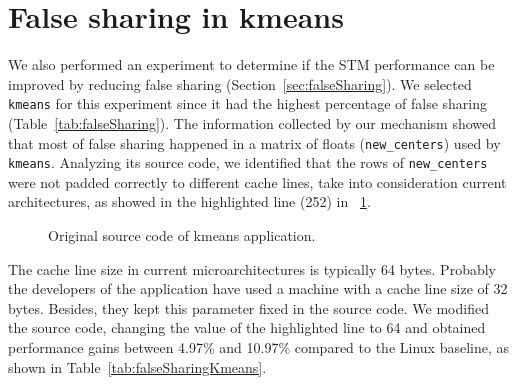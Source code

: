 \section{False sharing in kmeans}


We also performed an experiment to determine if the STM performance can be improved by reducing false sharing (Section~\ref{sec:falseSharing}). %
We selected \texttt{kmeans} for this experiment since it had the highest percentage of false sharing (Table~\ref{tab:falseSharing}). The information collected by our mechanism showed that most of false sharing happened in a matrix of floats (\texttt{new\_centers}) used by \texttt{kmeans}. Analyzing its source code, we identified that the rows of \texttt{new\_centers} were not padded correctly to different cache lines, take into consideration current architectures, 
as showed in the highlighted line (252) in \figurename~\ref{fig:kmeansFalseShare}.
\begin{figure}[!ht]
	\centering
	\caption{Original source code of kmeans application.}
	\label{fig:kmeansFalseShare}
\end{figure}
The cache line size in current microarchitectures is typically 64 bytes. Probably the developers of the application have used a machine with a cache line size of 32 bytes. Besides, they kept this parameter fixed in the source code. We modified the source code, changing the value of the highlighted line to 64 and obtained performance gains between 4.97\% and 10.97\% compared to the Linux baseline, as shown in Table~\ref{tab:falseSharingKmeans}.


